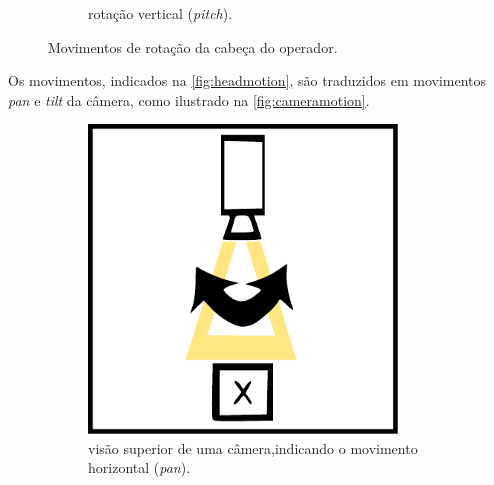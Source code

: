 \begin{figure}[H]
\begin{subfigure}{.5\textwidth}
		\caption{rotação vertical (\textit{pitch}).}
		\label{fig:headmotion_pitch}
	\end{subfigure}
	\caption{Movimentos de rotação da cabeça do operador.}
	\label{fig:headmotion}
\end{figure}

Os movimentos, indicados na \autoref{fig:headmotion}, são traduzidos em movimentos \textit{pan} e \textit{tilt} da câmera, como ilustrado na \autoref{fig:cameramotion}.

\begin{figure}[H]
	\centering
	\begin{subfigure}{.5\textwidth}
		\includegraphics[width=0.90\textwidth]{figuras/Pan1.pdf}
		\caption{visão superior de uma câmera,\newline indicando o movimento horizontal (\textit{pan}).}
		\label{fig:cameramotion_pan}
	\end{subfigure}%
	\begin{subfigure}{.5\textwidth}

\end{subfigure}
\end{figure}
